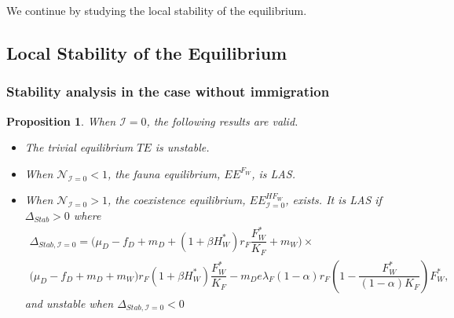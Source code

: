 \documentclass{article}
\newcommand{\lfw}{\lambda_{F}}
\newcommand{\lfw}{\lambda_{F}}
\newcommand{\cI}{\mathcal{I}}
\newtheorem{prop}{Proposition}
\begin{document}
We continue by studying the local stability of the equilibrium.

\subsection{Local Stability of the Equilibrium}

\subsubsection{Stability analysis in the case without immigration}
\begin{prop}\label{prop:stab, cI=0} When $\cI = 0$, the following results are valid.
\begin{itemize}
\item The trivial equilibrium $TE$ is unstable.
\item When $\mathcal{N}_{\cI = 0} < 1$, the fauna equilibrium, $EE^{F_W}$, is LAS.
\item When $\mathcal{N}_{\cI = 0} > 1$, the coexistence equilibrium, $EE^{HF_W}_{\cI =0}$, exists. It is LAS if $\Delta_{Stab} > 0$ where 
\begin{multline*}
\Delta_{Stab, \cI =0} = \Big(\mu_D - f_D + m_D + (1+\beta H_W^*)r_F \dfrac{F_W^*}{K_F} + m_W\Big) \times \\ \big( \mu_D  -f_D + m_D + m_W \big) r_F(1+ \beta H_W^*) \dfrac{F^*_W}{K_F} - 
m_D e \lfw (1- \alpha) r_F \left(1 - \dfrac{F_W^*}{(1- \alpha)K_F}\right) F_W^*,
\end{multline*}
and unstable when $\Delta_{Stab, \cI =0} < 0$
\end{itemize}
\end{prop}
\end{document}

